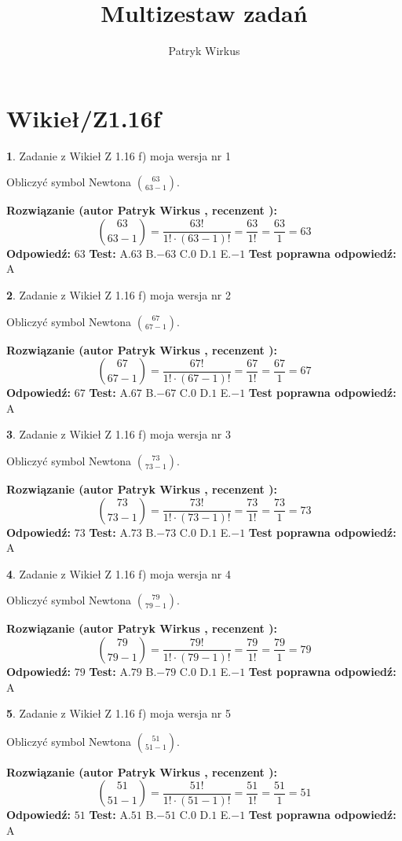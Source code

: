 \documentclass[12pt, a4paper]{article}
\title{Multizestaw zadań}
\author{Patryk Wirkus}
\date{}
\theoremstyle{definition} %
\newtheorem{zad}{}
\newcommand{\kategoria}[1]{\section{#1}}
\newcommand{\zadStart}[1]{\begin{zad}#1\newline}
\newcommand{\zadStop}{\end{zad}}
\newcommand{\rozwStart}[2]{\noindent \textbf{Rozwiązanie (autor #1 , recenzent #2): }\newline}
\newcommand{\rozwStop}{\newline}
\newcommand{\odpStart}{\noindent \textbf{Odpowiedź:}\newline}
\newcommand{\odpStop}{\newline}
\newcommand{\testStart}{\noindent \textbf{Test:}\newline}
\newcommand{\testStop}{\newline}
\newcommand{\kluczStart}{\noindent \textbf{Test poprawna odpowiedź:}\newline}
\newcommand{\kluczStop}{\newline}
\begin{document}
\maketitle

\kategoria{Wikieł/Z1.16f}


\zadStart{Zadanie z Wikieł Z 1.16 f) moja wersja nr 1}

Obliczyć symbol Newtona ${63 \choose 63-1}$.
\zadStop
\rozwStart{Patryk Wirkus}{}
$${63 \choose 63-1} = \frac{63!}{1! \cdot (63-1)!} = \frac{63}{1!} = \frac{63}{1} = 63$$
\rozwStop
\odpStart
$63$
\odpStop
\testStart
A.$63$ B.$-63$ C.$0$ D.$1$ E.$-1$
\testStop
\kluczStart
A
\kluczStop



\zadStart{Zadanie z Wikieł Z 1.16 f) moja wersja nr 2}

Obliczyć symbol Newtona ${67 \choose 67-1}$.
\zadStop
\rozwStart{Patryk Wirkus}{}
$${67 \choose 67-1} = \frac{67!}{1! \cdot (67-1)!} = \frac{67}{1!} = \frac{67}{1} = 67$$
\rozwStop
\odpStart
$67$
\odpStop
\testStart
A.$67$ B.$-67$ C.$0$ D.$1$ E.$-1$
\testStop
\kluczStart
A
\kluczStop



\zadStart{Zadanie z Wikieł Z 1.16 f) moja wersja nr 3}

Obliczyć symbol Newtona ${73 \choose 73-1}$.
\zadStop
\rozwStart{Patryk Wirkus}{}
$${73 \choose 73-1} = \frac{73!}{1! \cdot (73-1)!} = \frac{73}{1!} = \frac{73}{1} = 73$$
\rozwStop
\odpStart
$73$
\odpStop
\testStart
A.$73$ B.$-73$ C.$0$ D.$1$ E.$-1$
\testStop
\kluczStart
A
\kluczStop



\zadStart{Zadanie z Wikieł Z 1.16 f) moja wersja nr 4}

Obliczyć symbol Newtona ${79 \choose 79-1}$.
\zadStop
\rozwStart{Patryk Wirkus}{}
$${79 \choose 79-1} = \frac{79!}{1! \cdot (79-1)!} = \frac{79}{1!} = \frac{79}{1} = 79$$
\rozwStop
\odpStart
$79$
\odpStop
\testStart
A.$79$ B.$-79$ C.$0$ D.$1$ E.$-1$
\testStop
\kluczStart
A
\kluczStop



\zadStart{Zadanie z Wikieł Z 1.16 f) moja wersja nr 5}

Obliczyć symbol Newtona ${51 \choose 51-1}$.
\zadStop
\rozwStart{Patryk Wirkus}{}
$${51 \choose 51-1} = \frac{51!}{1! \cdot (51-1)!} = \frac{51}{1!} = \frac{51}{1} = 51$$
\rozwStop
\odpStart
$51$
\odpStop
\testStart
A.$51$ B.$-51$ C.$0$ D.$1$ E.$-1$
\testStop
\kluczStart
A
\kluczStop
\end{document}
